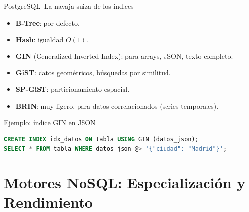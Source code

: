 \documentclass[aspectratio=169, 10pt, xcolor=table]{beamer}
\begin{document}
\begin{frame}[fragile]{PostgreSQL: La navaja suiza de los índices}
    \begin{itemize}
        \item \textbf{B-Tree}: por defecto.
        \item \textbf{Hash}: igualdad $O(1)$.
        \item \textbf{GIN} (Generalized Inverted Index): para arrays, JSON, texto completo.
        \item \textbf{GiST}: datos geométricos, búsquedas por similitud.
        \item \textbf{SP-GiST}: particionamiento espacial.
        \item \textbf{BRIN}: muy ligero, para datos correlacionados (series temporales).
    \end{itemize}
    \vspace{0.2cm}
    \begin{exampleblock}{Ejemplo: índice GIN en JSON}
        \begin{lstlisting}[language=SQL]
CREATE INDEX idx_datos ON tabla USING GIN (datos_json);
SELECT * FROM tabla WHERE datos_json @> '{"ciudad": "Madrid"}';
        \end{lstlisting}
    \end{exampleblock}
\end{frame}

\section{Motores NoSQL: Especialización y Rendimiento}
\end{document}
